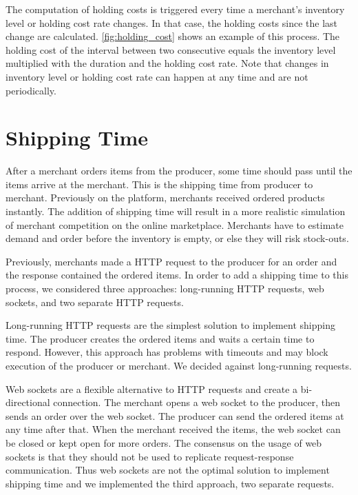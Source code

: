 The computation of holding costs is triggered every time a merchant's inventory level or holding cost rate changes.
In that case, the holding costs since the last change are calculated.
\cref{fig:holding_cost} shows an example of this process.
The holding cost of the interval between two consecutive equals the inventory level multiplied with the duration and the holding cost rate. 
Note that changes in inventory level or holding cost rate can happen at any time and are not periodically.

\section{Shipping Time}
\label{section:shipping_time}
After a merchant orders items from the producer, some time should pass until the items arrive at the merchant.
This is the shipping time from producer to merchant.
Previously on the \pricewars platform, merchants received ordered products instantly.
The addition of shipping time will result in a more realistic simulation of merchant competition on the online marketplace.
Merchants have to estimate demand and order before the inventory is empty, or else they will risk stock-outs.

Previously, merchants made a HTTP request to the producer for an order and the response contained the ordered items.
In order to add a shipping time to this process, we considered three approaches: long-running HTTP requests, web sockets, and two separate HTTP requests. 

Long-running HTTP requests are the simplest solution to implement shipping time.
The producer creates the ordered items and waits a certain time to respond.
However, this approach has problems with timeouts and may block execution of the producer or merchant.
We decided against long-running requests.

Web sockets are a flexible alternative to HTTP requests and create a bi-directional connection.
The merchant opens a web socket to the producer, then sends an order over the web socket.
The producer can send the ordered items at any time after that.
When the merchant received the items, the web socket can be closed or kept open for more orders.
The consensus on the usage of web sockets is that they should not be used to replicate request-response communication.
Thus web sockets are not the optimal solution to implement shipping time and we implemented the third approach, two separate requests.

